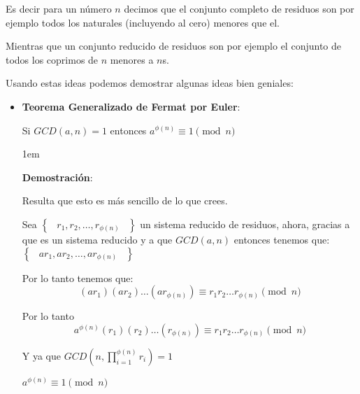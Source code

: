 \documentclass[12pt, fleqn]{report}                             %
\newenvironment{SmallIndentation}[1][0.75em]                    %
    {\begin{adjustwidth}{#1}{}\begin{footnotesize}}                 %
    {\end{footnotesize}\end{adjustwidth}}                           %
\DeclareMathOperator \Space {\quad}                             %
\DeclareMathOperator \MiniSpace {\;}                            %
\newcommand{\Set}[1]{\left\{ \MiniSpace #1 \MiniSpace \right\}} %
\begin{document}
            Es decir para un número $n$ decimos que el conjunto completo de residuos
            son por ejemplo todos los naturales (incluyendo al cero) menores que el.

            Mientras que un conjunto reducido de residuos son por ejemplo el conjunto
            de todos los coprimos de $n$ menores a $n$s.


            Usando estas ideas podemos demostrar algunas ideas bien geniales:

            \begin{itemize}

                \item \textbf{Teorema Generalizado de Fermat por Euler}:

                    Si $GCD(a, n) = 1$ entonces
                    $a^{\phi(n)} \equiv 1 \pmod{n}$

                    \begin{SmallIndentation}[1em]
                        \textbf{Demostración}:

                        Resulta que esto es más sencillo de lo que crees.

                        Sea $\Set{r_1, r_2, \dots, r_{\phi(n)}}$ un sistema reducido
                        de residuos, ahora, gracias a que es un sistema reducido y a 
                        que $GCD(a, n)$ entonces tenemos que:
                        $\Set{ar_1, ar_2, \dots, ar_{\phi(n)}}$

                        Por lo tanto tenemos que:
                        \begin{equation*}
                            (ar_1)(ar_2)\dots(ar_{\phi(n)})
                            \equiv
                            r_1 r_2 \dots r_{\phi(n)} \pmod{n}
                        \end{equation*}

                        Por lo tanto
                        \begin{equation*}
                            a^{\phi(n)}(r_1)(r_2)\dots(r_{\phi(n)})
                            \equiv
                            r_1 r_2 \dots r_{\phi(n)} \pmod{n}
                        \end{equation*}

                        Y ya que $GCD(n, \prod_{i=1}^{\phi(n)} r_i) = 1$

                        $a^{\phi(n)} \equiv 1 \pmod{n}$

                    \end{SmallIndentation}            

                \end{itemize}
\end{document}
